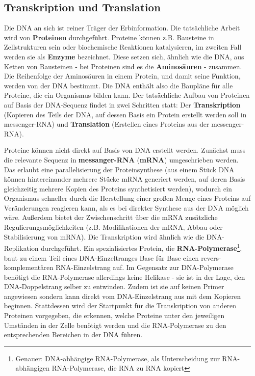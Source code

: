 \subsection{Transkription und Translation}
Die DNA an sich ist reiner Träger der Erbinformation. Die tatsächliche Arbeit wird von \textbf{Proteinen} durchgeführt. Proteine können z.B. Bausteine in Zellstrukturen sein oder biochemische Reaktionen katalysieren, im zweiten Fall werden sie als \textbf{Enzyme} bezeichnet. Diese setzen sich, ähnlich wie die DNA, aus Ketten von Bausteinen - bei Proteinen sind es die \textbf{Aminosäuren} - zusammen. Die Reihenfolge der Aminosäuren in einem Protein, und damit seine Funktion, werden von der DNA bestimmt. Die DNA enthält also die Baupläne für alle Proteine, die ein Organismus bilden kann. Der tatsächliche Aufbau von Proteinen auf Basis der DNA-Sequenz findet in zwei Schritten statt: Der \textbf{Transkription} (Kopieren des Teils der DNA, auf dessen Basis ein Protein erstellt werden soll in messenger-RNA) und \textbf{Translation} (Erstellen eines Proteins aus der messenger-RNA).

Proteine können nicht direkt auf Basis von DNA erstellt werden. Zunächst muss die relevante Sequenz in \textbf{messanger-RNA} (\textbf{mRNA}) umgeschrieben werden. Das erlaubt eine parallelisierung der Proteinsynthese (aus einem Stück DNA können hintereinander mehrere Stücke mRNA generiert werden, auf deren Basis gleichzeitig mehrere Kopien des Proteins synthetisiert werden), wodurch ein Organismus schneller durch die Herstellung einer großen Menge eines Proteins auf Veränderungen reagieren kann, als es bei direkter Synthese aus der DNA möglich wäre. Außerdem bietet der Zwischenschritt über die mRNA zusätzliche Regulierungsmöglichkeiten (z.B. Modifikationen der mRNA, Abbau oder Stabilisierung von mRNA). Die Transkription wird ähnlich wie die DNA-Replikation durchgeführt. Ein spezialisiertes Protein, die \textbf{RNA-Polymerase}\footnote{Genauer: DNA-abhängige RNA-Polymerase, als Unterscheidung zur RNA-abhängigen RNA-Polymerase, die RNA zu RNA kopiert}, baut zu einem Teil eines DNA-Einzeltranges Base für Base einen revers-komplementären RNA-Einzelstrang auf. Im Gegensatz zur DNA-Polymerase benötigt die RNA-Polymerase allerdings keine Helikase - sie ist in der Lage, den DNA-Doppelstrang selber zu entwinden. Zudem ist sie auf keinen Primer angewiesen sondern kann direkt vom DNA-Einzelstrang aus mit dem Kopieren beginnen. Stattdessen wird der Startpunkt für die Transkription von anderen Proteinen vorgegeben, die erkennen, welche Proteine unter den jeweiligen Umständen in der Zelle benötigt werden und die RNA-Polymerase zu den entsprechenden Bereichen in der DNA führen. 

